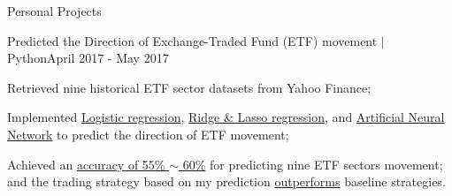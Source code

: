 \documentclass{my_resume} %
\begin{document}
\begin{rSection}{Personal Projects}


  \begin{rSubsection}{Predicted the Direction of Exchange-Traded Fund
    (ETF) movement $|$ Python}{}{April 2017 - May 2017}
  \item Retrieved nine historical ETF sector datasets from Yahoo Finance;
  \item Implemented \underline{Logistic regression}, \underline{Ridge \& Lasso
    regression}, and \underline{Artificial Neural Network} to predict the
    direction of ETF movement;
  \item Achieved an \underline{accuracy of 55\% $\sim$ 60\%} for predicting
    nine ETF sectors movement; and the trading strategy based on my prediction
    \underline{outperforms} baseline strategies.
  \end{rSubsection}



\end{rSection}
\end{document}
